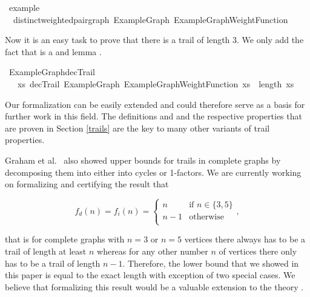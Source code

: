 \begin{isabellebody}
\begin{isamarkuptext}
\end{isamarkuptext}\isamarkuptrue%
\isamarkupfalse%
\ example{\isacharcolon}\ \isanewline
\ \ distinct{\isacharunderscore}weighted{\isacharunderscore}pair{\isacharunderscore}graph\ ExampleGraph\ ExampleGraphWeightFunction%
\isadelimproof
%
\endisadelimproof
%
\isatagproof
%
\endisatagproof
{\isafoldproof}%
%
\isadelimproof
%
\endisadelimproof
%
\begin{isamarkuptext}%
Now it is an easy task to prove that there is a trail of length 3. We only add the fact that
 is a  and lemma .%
\end{isamarkuptext}\isamarkuptrue%
\isamarkupfalse%
\ ExampleGraph{\isacharunderscore}decTrail{\isacharcolon}\isanewline
\ \ {\isachardoublequoteopen}{\isasymexists}\ xs{\isachardot}\ decTrail\ ExampleGraph\ ExampleGraphWeightFunction\ xs\ {\isasymand}\ length\ xs\ {\isacharequal}\ {}{\isachardoublequoteclose}%
\isadelimproof
%
\endisadelimproof
%
\isatagproof
%
\endisatagproof
{\isafoldproof}%
%
\isadelimproof
%
\endisadelimproof
%
\isadelimdocument
%
\endisadelimdocument
%
\isatagdocument
%
\isamarkuptrue%
%
\endisatagdocument
{\isafolddocument}%
%
\isadelimdocument
%
\endisadelimdocument
%
\begin{isamarkuptext}%
Our formalization can be easily extended and could therefore serve as a basis for further work in this field.
The definitions  and  and the respective properties that are proven in 
Section \ref{trails} are the key to many other variants of trail properties. 

Graham et al.~\cite{graham1973increasing} also showed upper bounds for trails in complete graphs by decomposing
them into either into cycles or 1-factors. We are currently working on formalizing and certifying the result 
that 

$$
f_d(n)= f_i(n) = 
\begin{cases}
n &  \text{if } n \in \{3,5\}\\
n-1 & \text{otherwise}\\
\end{cases},
$$

that is for complete graphs with $n=3$ or $n=5$ vertices there always has to be a trail of length at least $n$ whereas 
for any other number $n$ of vertices there only has to be a trail of length $n - 1$. Therefore, the lower bound that
we showed in this paper is equal to the exact length with exception of two special cases.  
We believe that formalizing this result would be a valuable extension to the theory .


\end{isamarkuptext}
\end{isabellebody}
